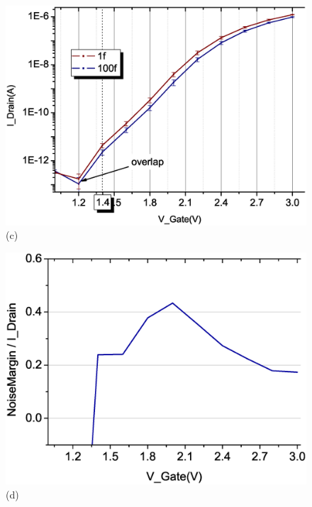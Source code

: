 \begin{figure}[h!]
\begin{minipage}[t][20cm][t]{1\textwidth}
\begin{minipage}[t]{0.5\textwidth}
            \centering
            \includegraphics[scale=0.3]{images/chapter3/208_devices/L2-8_log.eps}
            (c)
        \end{minipage}
        \hfill
        \begin{minipage}[t]{0.5\textwidth}
            \raggedleft
            \includegraphics[scale=0.3]{images/chapter3/208_devices/L2-8_margin.eps}
            \centering
            (d)
        \end{minipage}
        \vfill
        \begin{minipage}[t]{0.5\textwidth}
            \centering

\end{minipage}
\end{minipage}
\end{figure}
